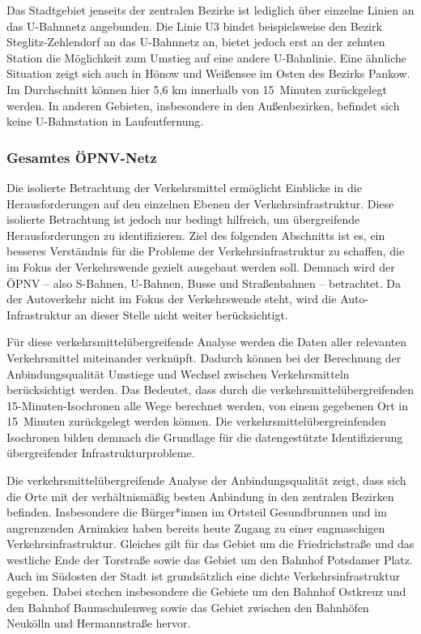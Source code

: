 
Das Stadtgebiet jenseits der zentralen Bezirke ist lediglich über einzelne Linien an das U-Bahnnetz angebunden. Die Linie U3 bindet beispielsweise den Bezirk Steglitz-Zehlendorf an das U-Bahnnetz an, bietet jedoch erst an der zehnten Station die Möglichkeit zum Umstieg auf eine andere U-Bahnlinie. Eine ähnliche Situation zeigt sich auch in Hönow und Weißensee im Osten des Bezirks Pankow. Im Durchschnitt können hier 5,6 km innerhalb von 15~Minuten zurückgelegt werden. In anderen Gebieten, insbesondere in den Außenbezirken, befindet sich keine U-Bahnstation in Laufentfernung.

\subsubsection{Gesamtes ÖPNV-Netz}

Die isolierte Betrachtung der Verkehrsmittel ermöglicht Einblicke in die Herausforderungen auf den einzelnen Ebenen der Verkehrsinfrastruktur. Diese isolierte Betrachtung ist jedoch nur bedingt hilfreich, um übergreifende Herausforderungen zu identifizieren. Ziel des folgenden Abschnitts ist es, ein besseres Verständnis für die Probleme der Verkehrsinfrastruktur zu schaffen, die im Fokus der Verkehrswende gezielt ausgebaut werden soll. Demnach wird der ÖPNV – also S-Bahnen, U-Bahnen, Busse und Straßenbahnen – betrachtet. Da der Autoverkehr nicht im Fokus der Verkehrswende steht, wird die Auto-Infrastruktur an dieser Stelle nicht weiter berücksichtigt.

Für diese verkehrsmittelübergreifende Analyse werden die Daten aller relevanten Verkehrsmittel miteinander verknüpft. Dadurch können bei der Berechnung der Anbindungsqualität Umstiege und Wechsel zwischen Verkehrsmitteln berücksichtigt werden. Das Bedeutet, dass durch die verkehrsmittelübergreifenden 15-Minuten-Isochronen alle Wege berechnet werden, von einem gegebenen Ort in 15~Minuten zurückgelegt werden können. Die verkehrsmittelübergreinfenden Isochronen bilden demnach die Grundlage für die datengestützte Identifizierung übergreifender Infrastrukturprobleme.


Die verkehrsmittelübergreifende Analyse der Anbindungsqualität zeigt, dass sich die Orte mit der verhältnismäßig besten Anbindung in den zentralen Bezirken befinden. Insbesondere die Bürger*innen im Ortsteil Gesundbrunnen und im angrenzenden Arnimkiez haben bereits heute Zugang zu einer engmaschigen Verkehrsinfrastruktur. Gleiches gilt für das Gebiet um die Friedrichstraße und das westliche Ende der Torstraße sowie das Gebiet um den Bahnhof Potsdamer Platz. Auch im Südosten der Stadt ist grundsätzlich eine dichte Verkehrsinfrastruktur gegeben. Dabei stechen insbesondere die Gebiete um den Bahnhof Ostkreuz und den Bahnhof Baumschulenweg sowie das Gebiet zwischen den Bahnhöfen Neukölln und Hermannstraße hervor.

